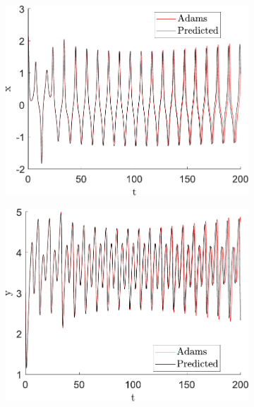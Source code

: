 \begin{figure}[H]
\centering
\begin{subfigure}[ht]{0.3\textwidth}
\includegraphics[scale=0.29]{files/adams_predicted_tx.pdf}
\end{subfigure}
\begin{subfigure}[ht]{0.3\textwidth}
\includegraphics[scale=0.29]{files/adams_predicted_ty.pdf}
\end{subfigure}
\begin{subfigure}[ht]{0.3\textwidth}

\end{subfigure}
\end{figure}
